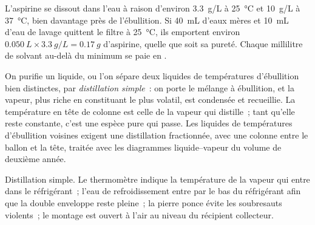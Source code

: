 \begin{example}
L'aspirine se dissout dans l'eau à raison d'environ \qty{3.3}{g/L} à
\qty{25}{\celsius} et \qty{10}{g/L} à \qty{37}{\celsius}, bien davantage
près de l'ébullition. Si \qty{40}{mL} d'eaux mères et \qty{10}{mL} d'eau
de lavage quittent le filtre à \qty{25}{\celsius}, ils emportent environ
$\qty{0.050}{L} \times \qty{3.3}{g/L} = \qty{0.17}{g}$ d'aspirine, quelle
que soit sa pureté. Chaque millilitre de solvant au-delà du minimum se
paie en .
\end{example}

On purifie un liquide, ou l'on sépare deux liquides de températures
d'ébullition bien distinctes, par \emph{distillation simple}~: on porte
le mélange à ébullition, et la vapeur, plus riche en constituant le plus
volatil, est condensée et recueillie. La température en tête de colonne
est celle de la vapeur qui distille~; tant qu'elle reste constante, c'est
une espèce pure qui passe. Les liquides de températures d'ébullition
voisines exigent une distillation fractionnée, avec une colonne entre le
ballon et la tête, traitée avec les diagrammes liquide--vapeur du volume
de deuxième année.

\begin{omfigure}

{\small Distillation simple. Le thermomètre indique la température de la
vapeur qui entre dans le réfrigérant~; l'eau de refroidissement entre
par le bas du réfrigérant afin que la double enveloppe reste pleine~; la
pierre ponce évite les soubresauts violents~; le montage est ouvert à
l'air au niveau du récipient collecteur.}
\end{omfigure}

